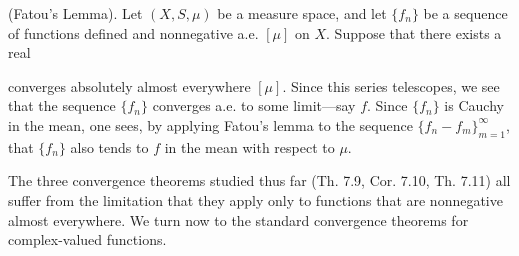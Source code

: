 (Fatou’s Lemma). Let $(X, S, \mu)$ be a measure space, and let $\{f_n\}$ be a sequence of functions defined and nonnegative a.e. $[\mu]$ on $X$. Suppose that there exists a real

converges absolutely almost everywhere $[\mu]$. Since this series telescopes, we see that the sequence $\{f_n\}$ converges a.e. to some limit—say $f$. Since $\{f_n\}$ is Cauchy in the mean, one sees, by applying Fatou’s lemma to the sequence $\{f_n - f_m\}_{m=1}^{\infty}$, that $\{f_n\}$ also tends to $f$ in the mean with respect to $\mu$.

The three convergence theorems studied thus far (Th. 7.9, Cor. 7.10, Th. 7.11) all suffer from the limitation that they apply only to functions that are nonnegative almost everywhere. We turn now to the standard convergence theorems for complex-valued functions.
